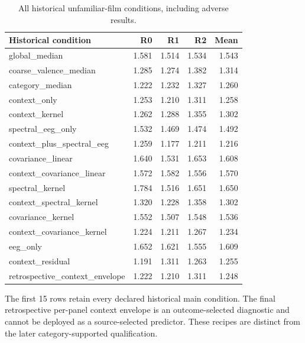 \begin{table}[tbp]
\centering
\small
\caption{All historical unfamiliar-film conditions, including adverse results.}
\label{tab:allconditions}
\begin{tabular}{lrrrr}
\toprule
Historical condition & R0 & R1 & R2 & Mean \\
\midrule
global\_median & 1.581 & 1.514 & 1.534 & 1.543 \\
coarse\_valence\_median & 1.285 & 1.274 & 1.382 & 1.314 \\
category\_median & 1.222 & 1.232 & 1.327 & 1.260 \\
context\_only & 1.253 & 1.210 & 1.311 & 1.258 \\
context\_kernel & 1.262 & 1.288 & 1.355 & 1.302 \\
spectral\_eeg\_only & 1.532 & 1.469 & 1.474 & 1.492 \\
context\_plus\_spectral\_eeg & 1.259 & 1.177 & 1.211 & 1.216 \\
covariance\_linear & 1.640 & 1.531 & 1.653 & 1.608 \\
context\_covariance\_linear & 1.572 & 1.582 & 1.556 & 1.570 \\
spectral\_kernel & 1.784 & 1.516 & 1.651 & 1.650 \\
context\_spectral\_kernel & 1.320 & 1.228 & 1.358 & 1.302 \\
covariance\_kernel & 1.552 & 1.507 & 1.548 & 1.536 \\
context\_covariance\_kernel & 1.224 & 1.211 & 1.267 & 1.234 \\
eeg\_only & 1.652 & 1.621 & 1.555 & 1.609 \\
context\_residual & 1.191 & 1.311 & 1.263 & 1.255 \\
retrospective\_context\_envelope & 1.222 & 1.210 & 1.311 & 1.248 \\
\bottomrule
\end{tabular}
\par\medskip\begin{minipage}{0.97\linewidth}\footnotesize The first 15 rows retain every declared historical main condition. The final retrospective per-panel context envelope is an outcome-selected diagnostic and cannot be deployed as a source-selected predictor. These recipes are distinct from the later category-supported qualification.\end{minipage}
\end{table}
